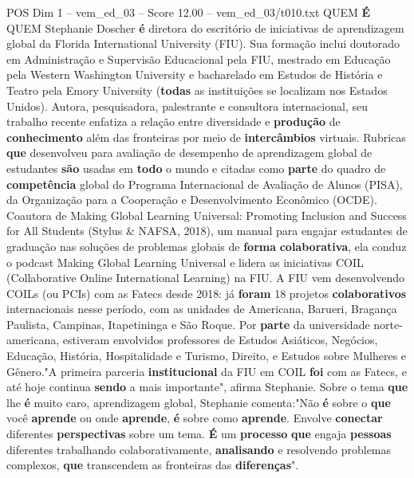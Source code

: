 \begin{textsample}{POS Dim 1 – vem\_ed\_03 – Score 12.00 – vem\_ed\_03/t010.txt}  \label{ex:f1_pos_157}
QUEM \textbf{É} QUEM Stephanie Doscher \textbf{é} diretora do escritório de iniciativas de aprendizagem global da Florida International University (FIU).
Sua formação inclui doutorado em Administração e Supervisão Educacional pela FIU, mestrado em Educação pela Western Washington University e bacharelado em Estudos de História e Teatro pela Emory University (\textbf{todas} as instituições se localizam nos Estados Unidos).
Autora, pesquisadora, palestrante e consultora internacional, seu trabalho recente enfatiza a relação entre diversidade e \textbf{produção} de \textbf{conhecimento} além das fronteiras por meio de \textbf{intercâmbios} virtuais.
Rubricas \textbf{que} desenvolveu para avaliação de desempenho de aprendizagem global de estudantes \textbf{são} usadas em \textbf{todo} o mundo e citadas como \textbf{parte} do quadro de \textbf{competência} global do Programa Internacional de Avaliação de Alunos (PISA), da Organização para a Cooperação e Desenvolvimento Econômico (OCDE).
Coautora de Making Global Learning Universal: Promoting Inclusion and Success for All Students (Stylus \& NAFSA, 2018), um manual para engajar estudantes de graduação nas soluções de problemas globais de \textbf{forma} \textbf{colaborativa}, ela conduz o podcast Making Global Learning Universal e lidera as iniciativas COIL (Collaborative Online International Learning) na FIU.
A FIU vem desenvolvendo COILs (ou PCIs) com as Fatecs desde 2018: já \textbf{foram} 18 projetos \textbf{colaborativos} internacionais nesse período, com as unidades de Americana, Barueri, Bragança Paulista, Campinas, Itapetininga e São Roque.
Por \textbf{parte} da universidade norte-americana, estiveram envolvidos professores de Estudos Asiáticos, Negócios, Educação, História, Hospitalidade e Turismo, Direito, e Estudos sobre Mulheres e Gênero."A primeira parceria \textbf{institucional} da FIU em COIL \textbf{foi} com as Fatecs, e até hoje continua \textbf{sendo} a mais importante", afirma Stephanie.
Sobre o tema \textbf{que} lhe \textbf{é} muito caro, aprendizagem global, Stephanie comenta:"Não \textbf{é} sobre o \textbf{que} você \textbf{aprende} ou onde \textbf{aprende}, \textbf{é} sobre como \textbf{aprende}.
Envolve \textbf{conectar} diferentes \textbf{perspectivas} sobre um tema. \textbf{É} um \textbf{processo} \textbf{que} engaja \textbf{pessoas} diferentes trabalhando colaborativamente, \textbf{analisando} e resolvendo problemas complexos, \textbf{que} transcendem as fronteiras das \textbf{diferenças}".

\end{textsample}
